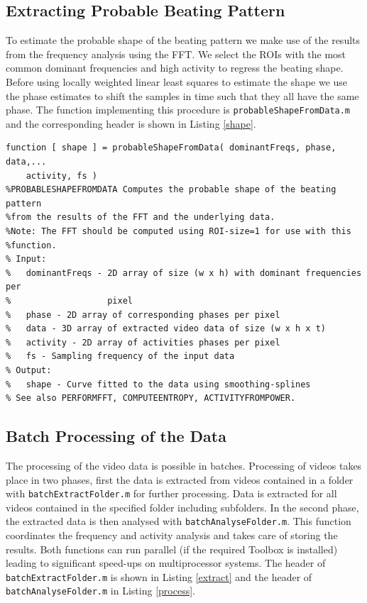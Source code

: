 \documentclass[11pt]{scrartcl}
\begin{document}
\subsection{Extracting Probable Beating Pattern}

To estimate the probable shape of the beating pattern we make use of the results from the frequency analysis using the FFT. We select the ROIs with the most common dominant frequencies and high activity to regress the beating shape. Before using locally weighted linear least squares to estimate the shape we use the phase estimates to shift the samples in time such that they all have the same phase. The function implementing this procedure is \texttt{probableShapeFromData.m} and the corresponding header is shown in Listing \ref{shape}. 

\begin{minipage}{\linewidth}
  \begin{lstlisting}[caption={Function for extracting the probable beating pattern.}, label=shape]
function [ shape ] = probableShapeFromData( dominantFreqs, phase, data,...
    activity, fs )
%PROBABLESHAPEFROMDATA Computes the probable shape of the beating pattern 
%from the results of the FFT and the underlying data.
%Note: The FFT should be computed using ROI-size=1 for use with this 
%function.
% Input:
%   dominantFreqs - 2D array of size (w x h) with dominant frequencies per 
%                   pixel 
%   phase - 2D array of corresponding phases per pixel
%   data - 3D array of extracted video data of size (w x h x t)
%   activity - 2D array of activities phases per pixel
%   fs - Sampling frequency of the input data
% Output:
%   shape - Curve fitted to the data using smoothing-splines
% See also PERFORMFFT, COMPUTEENTROPY, ACTIVITYFROMPOWER.  
\end{lstlisting}
\end{minipage}


\subsection{Batch Processing of the Data}

The processing of the video data is possible in batches. Processing of videos takes place in two phases, first the data is extracted from videos contained in a folder with \texttt{batchExtractFolder.m} for further processing. Data is extracted for all videos contained in the specified folder including subfolders. In the second phase, the extracted data is then analysed with \texttt{batchAnalyseFolder.m}. This function coordinates the frequency and activity analysis and takes care of storing the results. Both functions can run parallel (if the required Toolbox is installed) leading to significant speed-ups on multiprocessor systems. The header of \texttt{batchExtractFolder.m} is shown in Listing \ref{extract} and the header of \texttt{batchAnalyseFolder.m} in Listing \ref{process}.
\end{document}
